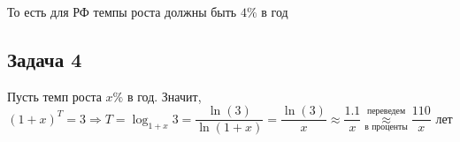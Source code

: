 \documentclass[a4paper, 10pt]{article}
\begin{document}
То есть для РФ темпы роста должны быть $4\%$ в год

\subsection{Задача 4}
Пусть темп роста $x\%$ в год. Значит, 
\begin{equation*}
    (1+x)^T=3\Longrightarrow T=\log_{1+x}3=\frac{\ln(3)}{\ln(1+x)}=\frac{\ln(3)}{x}\approx\frac{1.1}{x}\underset{\text{в проценты}}{\overset{\text{переведем}}{\approx}}\frac{110}{x}\text{ лет}
\end{equation*}
\end{document}
